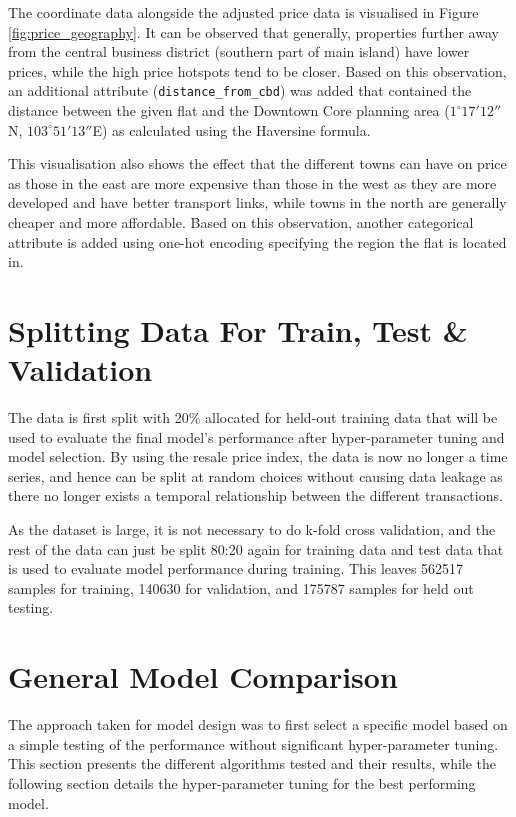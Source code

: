\documentclass[[12pt,conference]{IEEEtran}
\begin{document}
The coordinate data alongside the adjusted price data is visualised in Figure \ref{fig:price_geography}. It can be observed that generally, properties further away from the central business district (southern part of main island) have lower prices, while the high price hotspots tend to be closer. 
Based on this observation, an additional attribute (\texttt{distance\_from\_cbd}) was added that contained the distance between the given flat and the Downtown Core planning area ($1^\circ 17'12''$N, $103^\circ51'13''$E) as calculated using the Haversine formula.


This visualisation also shows the effect that the different towns can have on price as those in the east are more expensive than those in the west as they are more developed and have better transport links, while towns in the north are generally cheaper and more affordable. 
Based on this observation, another categorical attribute is added using one-hot encoding specifying the region the flat is located in.

\section{Splitting Data For Train, Test \& Validation}
The data is first split with 20\% allocated for held-out training data that will be used to evaluate the final model's performance after hyper-parameter tuning and model selection. 
By using the resale price index, the data is now no longer a time series, and hence can be split at random choices without causing data leakage as there no longer exists a temporal relationship between the different transactions. 

As the dataset is large, it is not necessary to do k-fold cross validation, and the rest of the data can just be split 80:20 again for training data and test data that is used to evaluate model performance during training. 
This leaves 562517 samples for training, 140630 for validation, and 175787 samples for held out testing.

\section{General Model Comparison}
The approach taken for model design was to first select a specific model based on a simple testing of the performance without significant hyper-parameter tuning. This section presents the different algorithms tested and their results, while the following section details the hyper-parameter tuning for the best performing model. 
\end{document}
